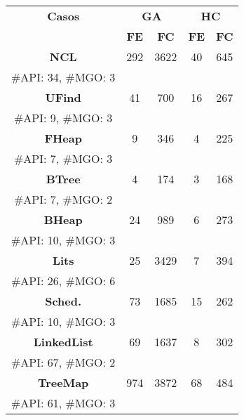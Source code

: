 \setlength{\tabcolsep}{4pt} 

\begin{table}[H]
\centering
\begin{tabular}{cccccc}
\hline
\multicolumn{2}{c}{\textbf{Casos}} & \multicolumn{2}{c}{\textbf{GA}} & \multicolumn{2}{c}{\textbf{HC}} \\
\cline{3-6}
\multicolumn{2}{c}{} & \textbf{\tiny FE} & \textbf{\tiny FC} & \textbf{\tiny FE} & \textbf{\tiny FC} \\
\hline
\multicolumn{2}{c}{\textbf{NCL}}            & 292   & 3622 & 40   & 645  \\
\multicolumn{2}{c}{\tiny \#API: 34, \#MGO: 3} & & & & \\

\multicolumn{2}{c}{\textbf{UFind}}          & 41     & 700    & 16  & 267  \\
\multicolumn{2}{c}{\tiny \#API: 9, \#MGO: 3}  & & & & \\

\multicolumn{2}{c}{\textbf{FHeap}}          & 9      & 346   & 4     & 225  \\
\multicolumn{2}{c}{\tiny \#API: 7, \#MGO: 3}  & & & & \\

\multicolumn{2}{c}{\textbf{BTree}}          & 4       & 174   & 3    & 168  \\
\multicolumn{2}{c}{\tiny \#API: 7, \#MGO: 2}  & & & & \\

\multicolumn{2}{c}{\textbf{BHeap}}          & 24    & 989  & 6    & 273  \\
\multicolumn{2}{c}{\tiny \#API: 10, \#MGO: 3} & & & & \\

\multicolumn{2}{c}{\textbf{Lits}}           & 25   & 3429 & 7    & 394  \\
\multicolumn{2}{c}{\tiny \#API: 26, \#MGO: 6} & & & & \\

\multicolumn{2}{c}{\textbf{Sched.}}         & 73     & 1685 & 15   & 262  \\
\multicolumn{2}{c}{\tiny \#API: 10, \#MGO: 3} & & & & \\

\multicolumn{2}{c}{\textbf{LinkedList}}     & 69     & 1637 & 8    & 302 \\
\multicolumn{2}{c}{\tiny \#API: 67, \#MGO: 2} & & & & \\

\multicolumn{2}{c}{\textbf{TreeMap}}        & 974  & 3872 & 68  & 484  \\
\multicolumn{2}{c}{\tiny \#API: 61, \#MGO: 3} & & & & \\


\end{tabular}
\end{table}
